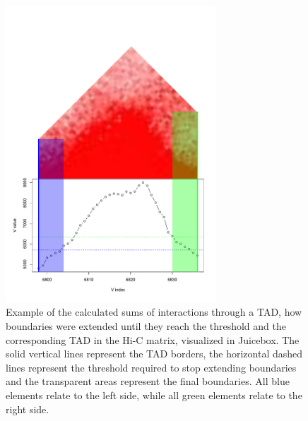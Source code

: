 \documentclass[11pt,a4paper]{report}
\begin{document}
\begin{figure}[ht]
	\includegraphics[width=0.7\textwidth]{Figures/5_boundary_example.pdf}
	\caption{Example of the calculated sums of interactions through a TAD, how boundaries were extended until they reach the threshold and the corresponding TAD in the Hi-C matrix, visualized in Juicebox. The solid vertical lines represent the TAD borders, the horizontal dashed lines represent the threshold required to stop extending boundaries and the transparent areas represent the final boundaries. All blue elements relate to the left side, while all green elements relate to the right side.}
	\label{boundary_ex}
\end{figure}
\end{document}
